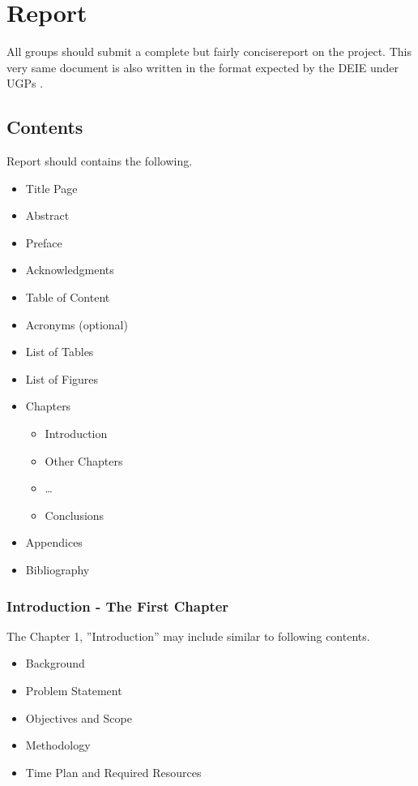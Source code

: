 \chapter{Report}\label{cha:report}

All groups should submit a complete but fairly concisereport on the project. This very same document is also written in the format expected by the DEIE under UGPs \cite{Abdelhakim2015}.

\section{Contents}\label{sec:report-contetns}

Report should contains the following.
\begin{itemize}
	\item Title Page
	\item Abstract
	\item Preface
	\item Acknowledgments
	\item Table of Content
	\item Acronyms (optional)
	\item List of Tables
	\item List of Figures
	\item Chapters
		\begin{itemize}
			\item Introduction
			\item Other Chapters
			\item \ldots
			\item Conclusions
		\end{itemize}
	\item Appendices
	\item Bibliography
\end{itemize}

\subsection{Introduction - The First Chapter}
The Chapter 1, ''Introduction''  may include similar to following contents.
\begin{itemize}
	\item Background
	\item Problem Statement
	\item Objectives and Scope
	\item Methodology
	\item Time Plan and Required Resources
\end{itemize}


